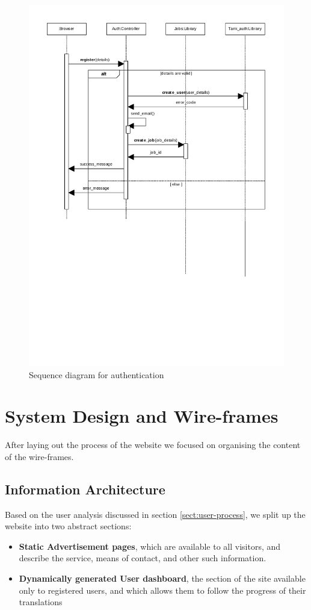 \documentclass{l3proj}
\begin{document}
\begin{figure}[h]
	\label{fig:seq-authetication}
	\centering
	\includegraphics[width=0.9\linewidth, trim=0px 250px 0px 0px, clip=true]
		{figures/seq-authentication}
	\caption{Sequence diagram for authentication}
\end{figure}

\newpage
\section{System Design and Wire-frames}
\label{sect:system-design-and-wireframes}
After laying out the process of the website we focused on organising the content
of the wire-frames.


\subsection{Information Architecture}
Based on the user analysis discussed in section \ref{sect:user-process}, we split
up the website into two abstract sections: 
\begin{itemize} 
	\item \textbf{Static Advertisement pages}, which are available to all visitors, and
	describe the service, means of contact, and other such information.
	\item \textbf{Dynamically generated User dashboard}, the section of the site available only to
	registered users, and which allows them to follow the progress of their translations
\end{itemize}
\end{document}
